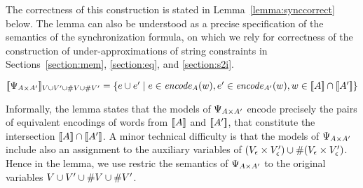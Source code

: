 \documentclass[sigplan,review,anonymous]{acmart}\settopmatter{printfolios=true,printccs=false,printacmref=false}
\begin{document}
The correctness of this construction is stated in Lemma~\ref{lemma:synccorrect} below. The lemma can also be understood as a precise specification of the semantics of the synchronization formula, on which we rely for correctness of the construction of under-approximations of string constraints in Sections~\ref{section:mem}, \ref{section:eq}, and \ref{section:s2i}. 
%


\begin{lemma}\label{lemma:synccorrect}
$
[\![\Psi_{A \times A'}]\!]_{V\cup V' \cup \#{V}\cup\#{V'}} =
\{e\cup e'\mid e \in \mathit{encode}_{A} (w),\\ e'\in\mathit{encode}_{A'} (w), w\in[\![A]\!] \cap [\![A']\!]\} 
$
\end{lemma}


Informally, the lemma states that the models of $\Psi_{A \times A'}$ encode precisely the pairs of equivalent encodings of words from $[\![A]\!]$ and $[\![A']\!]$, that constitute the intersection $[\![A]\!] \cap [\![A']\!]$. A minor technical difficulty is that the models of $\Psi_{A \times A'}$ include also an assignment to the auxiliary variables of $(V_\epsilon\times V'_\epsilon) \cup \#{(V_\epsilon\times V'_\epsilon)}$. Hence in the lemma, 
we use restric the semantics of $\Psi_{A \times A'}$ to the original variables $V \cup V' \cup \#{V} \cup \#{V'}$. %
\end{document}
